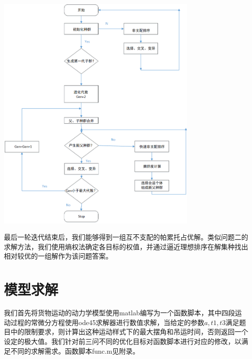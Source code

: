 \documentclass[withoutpreface,bwprint]{cumcmthesis} %
\begin{document}
\centerline{\includegraphics[width=10cm]{p2demo.png}}

最后一轮迭代结束后，我们能够得到一组互不支配的帕累托占优解。类似问题二的求解方法，我们使用熵权法确定各目标的权值，并通过逼近理想排序在解集种找出相对较优的一组解作为该问题答案。

\section{模型求解}
我们首先将货物运动的动力学模型使用matlab编写为一个函数脚本，其中四段运动过程的常微分方程使用ode45求解器进行数值求解，当给定的参数$a,t1,t3$满足题目中的限制要求，则计算出这种运动样式下的最大摆角和吊运时间，否则返回一个设定的极大值。我们针对前三问不同的优化目标对函数脚本进行对应的修改，以满足不同的求解需求。函数脚本func.m见附录。
\end{document}
